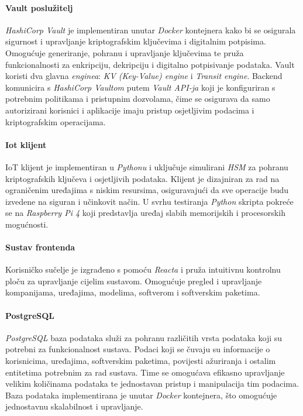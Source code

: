 \documentclass[zavrsnirad]{fer}
\begin{document}
	\paragraph{Vault poslužitelj}
	\label{arh_sus:vault_server}
	\textit{HashiCorp Vault} je implementiran unutar \textit{Docker} kontejnera kako bi se osigurala sigurnost i upravljanje kriptografskim ključevima i digitalnim potpisima. Omogućuje generiranje, pohranu i upravljanje ključevima te pruža funkcionalnosti za enkripciju, dekripciju i digitalno potpisivanje podataka. Vault koristi dva glavna \textit{enginea}: \textit{KV (Key-Value) engine} i \textit{Transit engine}. Backend komunicira s \textit{HashiCorp Vaultom} putem \textit{Vault API-ja} koji je konfiguriran s potrebnim politikama i pristupnim dozvolama, čime se osigurava da samo autorizirani korisnici i aplikacije imaju pristup osjetljivim podacima i kriptografskim operacijama.
	
	\paragraph{Iot klijent}
	\label{arh_sus:iot_klijent}
	IoT klijent je implementiran u \textit{Pythonu} i uključuje simulirani \textit{HSM} za pohranu kriptografskih ključeva i osjetljivih podataka. Klijent je dizajniran za rad na ograničenim uređajima s niskim resursima, osiguravajući da sve operacije budu izvedene na siguran i učinkovit način. U svrhu testiranja \textit{Python} skripta pokreće se na \textit{Raspberry Pi 4} koji predstavlja uređaj slabih memorijskih i procesorskih mogućnosti.
	
	\paragraph{Sustav frontenda}
	\label{arh_sus:frontend}
	Korisničko sučelje je izgrađeno s pomoću \textit{Reacta} i pruža intuitivnu kontrolnu ploču za upravljanje cijelim sustavom. Omogućuje pregled i upravljanje kompanijama, uređajima, modelima, softverom i softverskim paketima.
	
	\paragraph{PostgreSQL}
	\label{arh_sus:psql}
	\textit{PostgreSQL} baza podataka služi za pohranu različitih vrsta podataka koji su potrebni za funkcionalnost sustava. Podaci koji se čuvaju su informacije o korisnicima, uređajima, softverskim paketima, povijesti ažuriranja i ostalim entitetima potrebnim za rad sustava. Time se omogućava efikasno upravljanje velikim količinama podataka te jednostavan pristup i manipulacija tim podacima. Baza podataka implementirana je unutar \textit{Docker} kontejnera, što omogućuje jednostavnu skalabilnost i upravljanje.
	
\end{document}
